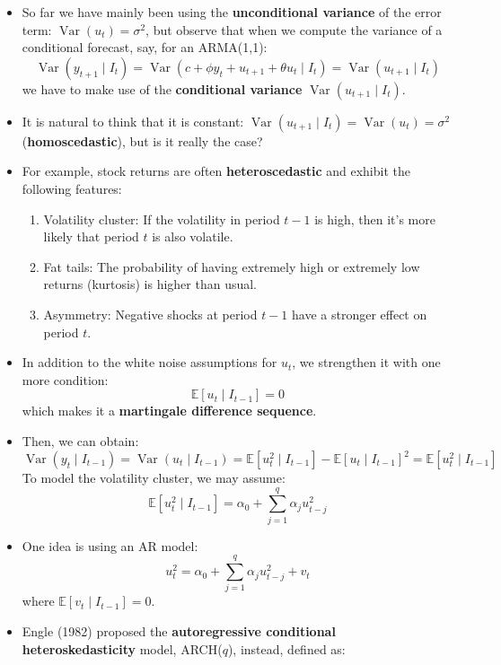 \documentclass[notitlepage]{article}
\DeclareMathOperator{\Var}{Var}
\begin{document}
\begin{itemize}
    \item So far we have mainly been using the \textbf{unconditional variance} of the error term: \(\Var(u_t) = \sigma^2\), but observe that when we compute the variance of a conditional forecast, say, for an ARMA(1,1):
    \[
    \Var(y_{t+1} \mid I_t) = \Var(c + \phi y_t + u_{t+1} + \theta u_t \mid I_t) = \Var(u_{t+1} \mid I_t)
    \]
    we have to make use of the \textbf{conditional variance} \(\Var(u_{t+1} \mid I_t)\).
    \item It is natural to think that it is constant: \(\Var(u_{t+1} \mid I_t) = \Var(u_t) = \sigma^2\) (\textbf{homoscedastic}), but is it really the case?
    \item For example, stock returns are often \textbf{heteroscedastic} and exhibit the following features:
    \begin{enumerate}
        \item Volatility cluster: If the volatility in period \(t-1\) is high, then it's more likely that period \(t\) is also volatile.
        \item Fat tails: The probability of having extremely high or extremely low returns (kurtosis) is higher than usual.
        \item Asymmetry: Negative shocks at period \(t-1\) have a stronger effect on period \(t\).
    \end{enumerate}
    \item In addition to the white noise assumptions for \(u_t\), we strengthen it with one more condition:
    \[
    \mathbb{E}[u_t \mid I_{t-1}] = 0
    \]
    which makes it a \textbf{martingale difference sequence}.
    \item Then, we can obtain:
    \[
    \Var(y_t \mid I_{t-1}) = \Var(u_t \mid I_{t-1}) = \mathbb{E}[u_t^2 \mid I_{t-1}] - \mathbb{E}[u_t \mid I_{t-1}]^2 = \mathbb{E}[u_t^2 \mid I_{t-1}]
    \]
    To model the volatility cluster, we may assume:
    \[
    \mathbb{E}[u_t^2 \mid I_{t-1}] = \alpha_0 + \sum_{j=1}^q \alpha_j u_{t-j}^2
    \]
    \item One idea is using an AR model:
    \[
    u_t^2 = \alpha_0 + \sum_{j=1}^q \alpha_j u_{t-j}^2 + v_t
    \]
    where \(\mathbb{E}[v_t \mid I_{t-1}]=0\).
    \item Engle (1982) proposed the \textbf{autoregressive conditional heteroskedasticity} model, ARCH(\(q\)), instead, defined as:

\end{itemize}
\end{document}

